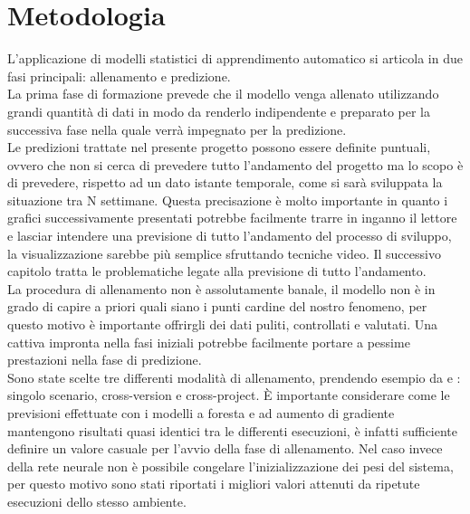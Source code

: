 \documentclass[%
    corpo=12pt,
    twoside,
    oldstyle,
    autoretitolo,
    greek,
    evenboxes,
]{toptesi}
\begin{document}
\section{Metodologia}
L'applicazione di modelli statistici di apprendimento automatico si articola in due fasi principali: allenamento e predizione.\\
La prima fase di formazione prevede che il modello venga allenato utilizzando grandi quantità di dati in modo da renderlo indipendente e preparato per la successiva fase nella quale verrà impegnato per la predizione.\\
Le predizioni trattate nel presente progetto possono essere definite puntuali, ovvero che non si cerca di prevedere tutto l'andamento del progetto ma lo scopo è di prevedere, rispetto ad un dato istante temporale, come si sarà sviluppata la situazione tra N settimane. Questa precisazione è molto importante in quanto i grafici successivamente presentati potrebbe facilmente trarre in inganno il lettore e lasciar intendere una previsione di tutto l'andamento del processo di sviluppo, la visualizzazione sarebbe più semplice sfruttando tecniche video. Il successivo capitolo tratta le problematiche legate alla previsione di tutto l'andamento.\\
La procedura di allenamento non è assolutamente banale, il modello non è in grado di capire a priori quali siano i punti cardine del nostro fenomeno, per questo motivo è importante offrirgli dei dati puliti, controllati e valutati. Una cattiva impronta nella fasi iniziali potrebbe facilmente portare a pessime prestazioni nella fase di predizione.\\
Sono state scelte tre differenti modalità di allenamento, prendendo esempio da \cite{Chen} e \cite{super_unsuper}: singolo scenario, cross-version e cross-project. È importante considerare come le previsioni effettuate con i modelli a foresta e ad aumento di gradiente mantengono risultati quasi identici tra le differenti esecuzioni, è infatti sufficiente definire un valore casuale per l'avvio della fase di allenamento. Nel caso invece della rete neurale non è possibile congelare l’inizializzazione dei pesi del sistema, per questo motivo sono stati riportati i migliori valori attenuti da ripetute esecuzioni dello stesso ambiente.
\end{document}
